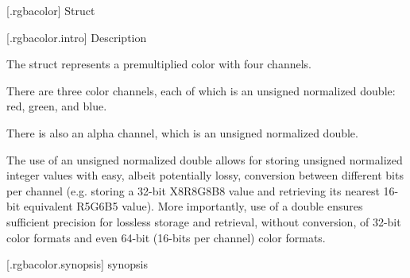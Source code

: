  [\iotwod.rgbacolor] {Struct }

 [\iotwod.rgbacolor.intro] { Description}

\pnum
{}%
The  struct represents a premultiplied color with four 
channels.

\pnum
There are three color channels, each of which is an unsigned normalized double: 
red, green, and blue.

\pnum
There is also an alpha channel, which is an unsigned normalized double.

\pnum
The use of an unsigned normalized double allows for storing unsigned normalized 
integer values with easy, albeit potentially lossy, conversion between 
different bits per channel (e.g. storing a 32-bit X8R8G8B8 value and retrieving 
its nearest 16-bit equivalent R5G6B5 value). More importantly, use of a double 
ensures sufficient precision for lossless storage and retrieval, without 
conversion, of 32-bit color formats and even 64-bit (16-bits per channel) color 
formats.

 [\iotwod.rgbacolor.synopsis] { synopsis}

